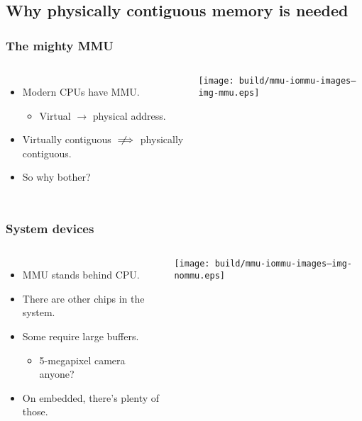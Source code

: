 \subsection{Why physically contiguous memory is needed}

\begin{frame}
  \frametitle{The mighty MMU}

  \begin{columns}[c]

    \begin{itemize}
    \item Modern CPUs have MMU.
      \begin{itemize}
      \item Virtual $\rightarrow$ physical address.
      \end{itemize}
    \item Virtually contiguous $\notimplies$ physically contiguous.
    \item So why bother?
    \end{itemize}

    \begin{center}
      \texttt{[image: build/mmu-iommu-images--img-mmu.eps]}
    \end{center}

  \end{columns}
\end{frame}

\begin{frame}
  \frametitle{System devices}

  \begin{columns}[c]

    \begin{itemize}
    \item MMU stands behind CPU.
    \item There are other chips in the system.
    \item Some require large buffers.
      \begin{itemize}
      \item 5-megapixel camera anyone?
      \end{itemize}
    \item On embedded, there's plenty of those.
    \end{itemize}

    \begin{center}
      \texttt{[image: build/mmu-iommu-images--img-nommu.eps]}
    \end{center}

  \end{columns}
\end{frame}

